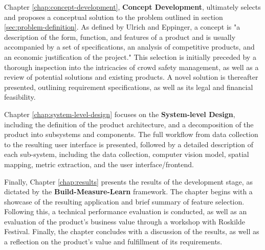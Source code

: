 Chapter \ref{chap:concept-development}, \textbf{Concept Development}, ultimately selects and proposes a conceptual solution to the problem outlined in section \ref{sec:problem-definition}. As defined by Ulrich and Eppinger, a concept is "a description of the form, function, and features of a product and is usually accompanied by a set of specifications, an analysis of competitive products, and an economic justification of the project." \cite{ulrich_eppinger} This selection is initially preceded by a thorough inspection into the intricacies of crowd safety management, as well as a review of potential solutions and existing products. A novel solution is thereafter presented, outlining requirement specifications, as well as its legal and financial feasibility.

Chapter \ref{chap:system-level-design} focuses on the \textbf{System-level Design}, including the definition of the product architecture, and a decomposition of the product into subsystems and components. The full workflow from data collection to the resulting user interface is presented, followed by a detailed description of each sub-system, including the data collection, computer vision model, spatial mapping, metric extraction, and the user interface/frontend.

Finally, Chapter \ref{chap:results} presents the results of the development stage, as dictated by the \textbf{Build-Measure-Learn} framework. The chapter begins with a showcase of the resulting application and brief summary of feature selection. Following this, a technical performance evaluation is conducted, as well as an evaluation of the product's business value through a workshop with Roskilde Festival. Finally, the chapter concludes with a discussion of the results, as well as a reflection on the product's value and fulfillment of its requirements.